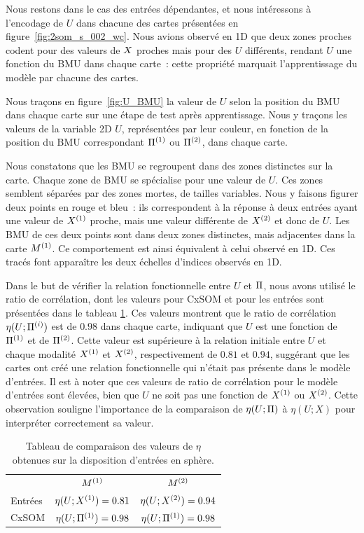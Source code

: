 \documentclass[../main]{subfiles}
\begin{document}
Nous restons dans le cas des entrées dépendantes, et nous intéressons à l'encodage de $U$ dans chacune des cartes présentées en figure~\ref{fig:2som_s_002_wc}.
Nous avions observé en 1D que deux zones proches codent pour des valeurs de $X$ proches mais pour des $U$ différents, rendant $U$ une fonction du BMU dans chaque carte~: cette propriété marquait l'apprentissage du modèle par chacune des cartes.

Nous traçons en figure~\ref{fig:U_BMU} la valeur de $U$ selon la position du BMU dans chaque carte sur une étape de test après apprentissage.
Nous y traçons les valeurs de la variable 2D $U$, représentées par leur couleur, en fonction de la position du BMU correspondant $\Pi^{({1})}$ ou $\Pi^{({2})}$, dans chaque carte.

Nous constatons que les BMU se regroupent dans des zones distinctes sur la carte. Chaque zone de BMU se spécialise pour une valeur de $U$. Ces zones semblent séparées par des zones mortes, de tailles variables.
Nous y faisons figurer deux points en rouge et bleu~: ils correspondent à la réponse à deux entrées ayant une valeur de $X^{({1})}$ proche, mais une valeur différente de $X^{({2})}$ et donc de $U$.
Les BMU de ces deux points sont dans deux zones distinctes, mais adjacentes dans la carte $M^{({1})}$. Ce comportement est ainsi équivalent à celui observé en 1D. 
Ces tracés font apparaître les deux échelles d'indices observés en 1D.

Dans le but de vérifier la relation fonctionnelle entre $U$ et $\Pi$, nous avons utilisé le ratio de corrélation, dont les valeurs pour CxSOM et pour les entrées sont présentées dans le tableau \ref{tab:eta2D}. Ces valeurs montrent que le ratio de corrélation $\eta(U;\Pi^{({i})})$ est de $0.98$ dans chaque carte, indiquant que $U$ est une fonction de $\Pi^{({1})}$ et de $\Pi^{({2})}$. Cette valeur est supérieure à la relation initiale entre $U$ et chaque modalité $X^{({1})}$ et $X^{({2})}$, respectivement de $0.81$ et $0.94$, suggérant que les cartes ont créé une relation fonctionnelle qui n'était pas présente dans le modèle d'entrées.
Il est à noter que ces valeurs de ratio de corrélation pour le modèle d'entrées sont élevées, bien que $U$ ne soit pas une fonction de $X^{({1})}$ ou $X^{({2})}$. 
Cette observation souligne l'importance de la comparaison de $\eta(U;\Pi)$ à $\eta(U;X)$ pour interpréter correctement sa valeur.

\begin{table}
	\caption{Tableau de comparaison des valeurs de $\eta$ obtenues sur la disposition d'entrées en sphère. \label{tab:eta2D}}
	\centering\begin{tabular}{lcc}
						&$M^{({1})}$ 					& $M^{({2})}$ 						\\
		Entrées 		& $\eta(U;X^{({1})}) = 0.81$ & $\eta(U;X^{({2})}) = 0.94$  \\
		CxSOM  	 		& $\eta(U;\Pi^{({1})}) = 0.98$ & $\eta(U;\Pi^{({1})}) = 0.98$ 	\\
	\end{tabular}
\end{table}
\end{document}
